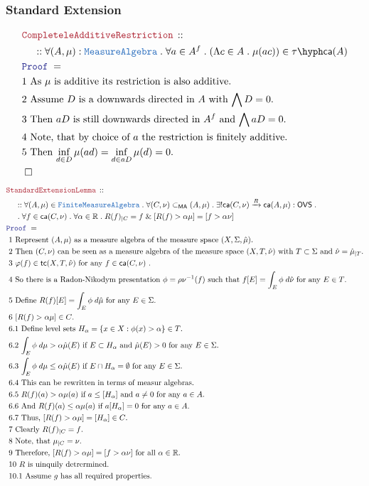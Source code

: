 \documentclass[12pt]{scrartcl}
\newcommand{\TYPE}[1]{\textcolor{NavyBlue}{\mathtt{#1}}}
\newcommand{\LOGIC}[1]{\textcolor{Blue}{\mathtt{#1}}}
\newcommand{\THM}[1]{\textcolor{Maroon}{\mathtt{#1}}}
\renewcommand{\.}{\; . \;}
\newcommand{\Theorem}[2]{& \THM{#1} \, :: \, #2 \\ & \Proof = \\ }
\newcommand{\NewLine}{\\ & \kern 1pc}
\newcommand{\Page}[1]{ \begin{align*} #1 \end{align*}   }
\renewcommand{\And}{\; \& \;}
\newcommand{\Reals}{\mathbb{R} }
\newcommand{\Arrow}{\xrightarrow}
\newcommand{\QED}{\; \square}
\newcommand{\EndProof}{& \QED \\}
\newcommand{\Proof}{\LOGIC{Proof} \; }
\newcommand{\Explain}[1]{& \text{#1.} \\}
\newcommand{\Finite}{\TYPE{Finite}}
\newcommand{\caf}{\mathsf{ca}}
\newcommand{\tc}{\mathsf{tc}}
\newcommand{\MA}{\TYPE{MeasureAlgebra}}
\newcommand{\ma}{\mathsf{MA}}
\newcommand{\Caf}{\tau\hyph\mathsf{ca}}
\begin{document}
\subsubsection{Standard Extension}
\Page{
	\Theorem{CompleteleAdditiveRestriction}
	{
		\NewLine ::		
		\forall (A,\mu) : \MA \.
		\forall a \in A^f \.
		(\Lambda c \in A \. \mu(ac)) \in \Caf(A) 
	}
	\Explain{1 As $\mu$ is additive its restriction is also additive}
	\Explain{2 Assume $D$ is a downwards directed in $A$ with $\bigwedge D = 0$}
	\Explain{3 Then $aD$ is still downwards directed in $A^f$ and $\bigwedge aD = 0 $}
	\Explain{4 Note, that by choice of $a$ the restriction is finitely additive}
	\Explain{5 Then $\inf_{d \in D} \mu(ad) = \inf_{d \in aD} \mu(d) = 0$}
	\EndProof
}\Page{
	\Theorem{StandardExtensionLemma}
	{
		\NewLine ::		
		\forall (A,\mu) \in \Finite\MA \.
		\forall (C,\nu) \subset_\ma (A,\mu) \.
		\exists! \caf(C,\nu) \Arrow{R} \caf(A,\mu) : \mathsf{OVS} \. \NewLine \.
		\forall f \in \caf(C,\nu) \.
		\forall \alpha \in \Reals \.
		R(f)_{|C} = f \And
		[R(f) > \alpha \mu]   =   [f > \alpha \nu]
	}
	\Explain{ 1 Represent $(A,\mu)$ as a measure algebra of the
		measure space $(X,\Sigma,\hat \mu)$}
	\Explain{ 2 Then $(C,\nu)$ can be seen as a measure algebra of the  
		measure space $(X, T, \hat \nu)$  with $T \subset \Sigma$ 
		and $\hat \nu = \hat \mu_{|T}$}
	\Explain{ 3 $\varphi(f) \in \tc(X, T ,\hat \nu)$  for any $f \in \caf(C,\nu)$ }
	\Explain{ 4 So there is a Radon-Nikodym presentation $\phi = \rho\nu^{-1}(f)$
		such that $f[E] = \int_E \phi \; d\hat\nu$ for any $E \in T$}
	\Explain{ 5 Define $R(f)[E] = \int_E \phi \; d\hat\mu$ 
		for any $E \in \Sigma$}
	\Explain{ 6 $[R(f) > \alpha \mu] \in C$}
	\Explain{ 6.1 Define level sets $H_\alpha = \{ x \in X : \phi(x) > \alpha \} \in T$}
	\Explain{ 6.2 $\int_E \phi \; d\mu > \alpha \hat \mu(E) $
		 if $E \subset H_\alpha$ and $\hat \mu(E) > 0$ for any $E \in \Sigma$}
	\Explain{ 6.3 $\int_E \phi \; d\mu \le \alpha \hat \mu(E) $
		 if $E \cap H_\alpha = \emptyset$ for any $E \in \Sigma$}
	\Explain{ 6.4 This can be rewritten in terms of measur algebras}
	\Explain{ 6.5 $R(f)(a) > \alpha \mu(a)$ if $a \le [H_\alpha]$ and $a \neq 0$  
		for any $a \in A$}
	\Explain{ 6.6 And $R(f)(a) \le \alpha \mu(a)$ if $a[H_\alpha] = 0$ 
		for any $a \in A$}
	\Explain{ 6.7 Thus, $[R(f) > \alpha \mu] = [H_\alpha] \in C$}	
	\Explain{ 7 Clearly $R(f)_{|C} = f$}
	\Explain{ 8 Note, that $\mu_{|C} = \nu$}
	\Explain{ 9 Therefore, $[R(f) > \alpha \mu]   =   [f > \alpha \nu]$
		for all $\alpha \in \Reals$}
	\Explain{ 10 $R$ is uinquily detrermined}
	\Explain{ 10.1 Assume $g$ has all required properties}
}
\end{document}

